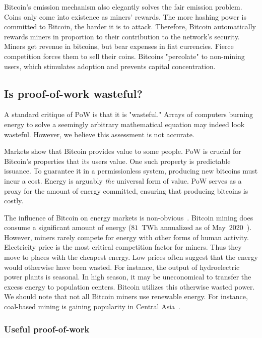 Bitcoin's emission mechanism also elegantly solves the fair emission problem.
Coins only come into existence as miners' rewards.
The more hashing power is committed to Bitcoin, the harder it is to attack.
Therefore, Bitcoin automatically rewards miners in proportion to their contribution to the network's security.
Miners get revenue in bitcoins, but bear expenses in fiat currencies.
Fierce competition forces them to sell their coins.
Bitcoins "percolate" to non-mining users, which stimulates adoption and prevents capital concentration.


\subsection{Is proof-of-work wasteful?}

A standard critique of PoW is that it is "wasteful."
Arrays of computers burning energy to solve a seemingly arbitrary mathematical equation may indeed look wasteful.
However, we believe this assessment is not accurate.

Markets show that Bitcoin provides value to some people.
PoW is crucial for Bitcoin's properties that its users value.
One such property is predictable issuance.
To guarantee it in a permissionless system, producing new bitcoins must incur a cost.
Energy is arguably \textit{the} universal form of value.
PoW serves as a proxy for the amount of energy committed, ensuring that producing bitcoins is costly.

The influence of Bitcoin on energy markets is non-obvious~\cite{Carter2020}.
Bitcoin mining does consume a significant amount of energy ($81$~TWh annualized as of May~2020~\cite{Rauchs2020}).
However, miners rarely compete for energy with other forms of human activity.
Electricity price is the most critical competition factor for miners.
Thus they move to places with the cheapest energy.
Low prices often suggest that the energy would otherwise have been wasted.
For instance, the output of hydroelectric power plants is seasonal.
In high season, it may be uneconomical to transfer the excess energy to population centers.
Bitcoin utilizes this otherwise wasted power.
We should note that not all Bitcoin miners use renewable energy.
For instance, coal-based mining is gaining popularity in Central Asia~\cite{8BTCStaff2020}.


\subsubsection*{Useful proof-of-work}

